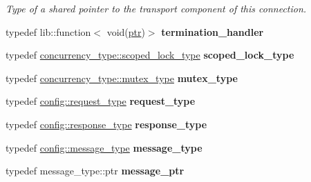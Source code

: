 \begin{DoxyCompactItemize}
\begin{DoxyCompactList}\small\item\em Type of a shared pointer to the transport component of this connection. \end{DoxyCompactList}\item 
typedef lib\+::function$<$ void(\hyperlink{classwebsocketpp_1_1connection_ab910d42e3bde91546183cc54642f32ab}{ptr})$>$ {\bfseries termination\+\_\+handler}\hypertarget{classwebsocketpp_1_1connection_a8da9613d1f13c9f4571ffb0810d43e63}{}\label{classwebsocketpp_1_1connection_a8da9613d1f13c9f4571ffb0810d43e63}

\item 
typedef \hyperlink{classwebsocketpp_1_1concurrency_1_1none_af2d121eeb6202694819578ba4bb00d3e}{concurrency\+\_\+type\+::scoped\+\_\+lock\+\_\+type} {\bfseries scoped\+\_\+lock\+\_\+type}\hypertarget{classwebsocketpp_1_1connection_a22ec65b3e3d5159ea61f885066e12caa}{}\label{classwebsocketpp_1_1connection_a22ec65b3e3d5159ea61f885066e12caa}

\item 
typedef \hyperlink{classwebsocketpp_1_1concurrency_1_1none_a3cf002cfc62e64e920a91a06f5e6fbc3}{concurrency\+\_\+type\+::mutex\+\_\+type} {\bfseries mutex\+\_\+type}\hypertarget{classwebsocketpp_1_1connection_a837046a7435ad7d051ac6da827d78caa}{}\label{classwebsocketpp_1_1connection_a837046a7435ad7d051ac6da827d78caa}

\item 
typedef \hyperlink{classwebsocketpp_1_1http_1_1parser_1_1request}{config\+::request\+\_\+type} {\bfseries request\+\_\+type}\hypertarget{classwebsocketpp_1_1connection_ac4d9911b0954de83079ce6867a5cf57f}{}\label{classwebsocketpp_1_1connection_ac4d9911b0954de83079ce6867a5cf57f}

\item 
typedef \hyperlink{classwebsocketpp_1_1http_1_1parser_1_1response}{config\+::response\+\_\+type} {\bfseries response\+\_\+type}\hypertarget{classwebsocketpp_1_1connection_a0d2d5908eaaea749bcf8fd0939b05d3b}{}\label{classwebsocketpp_1_1connection_a0d2d5908eaaea749bcf8fd0939b05d3b}

\item 
typedef \hyperlink{classwebsocketpp_1_1message__buffer_1_1message}{config\+::message\+\_\+type} {\bfseries message\+\_\+type}\hypertarget{classwebsocketpp_1_1connection_a26f1fe3979ff1d2dc5e1461e4f2bc621}{}\label{classwebsocketpp_1_1connection_a26f1fe3979ff1d2dc5e1461e4f2bc621}

\item 
typedef message\+\_\+type\+::ptr {\bfseries message\+\_\+ptr}\hypertarget{classwebsocketpp_1_1connection_a3b98c091caf54540024538d2394ffb57}{}\label{classwebsocketpp_1_1connection_a3b98c091caf54540024538d2394ffb57}


\end{DoxyCompactItemize}
